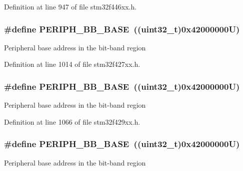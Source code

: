 Definition at line 947 of file stm32f446xx.\+h.

\subsubsection[{\texorpdfstring{P\+E\+R\+I\+P\+H\+\_\+\+B\+B\+\_\+\+B\+A\+SE}{PERIPH_BB_BASE}}]{\setlength{\rightskip}{0pt plus 5cm}\#define P\+E\+R\+I\+P\+H\+\_\+\+B\+B\+\_\+\+B\+A\+SE~((uint32\+\_\+t)0x42000000\+U)}\hypertarget{group___peripheral__memory__map_gaed7efc100877000845c236ccdc9e144a}{}\label{group___peripheral__memory__map_gaed7efc100877000845c236ccdc9e144a}
Peripheral base address in the bit-\/band region 

Definition at line 1014 of file stm32f427xx.\+h.

\subsubsection[{\texorpdfstring{P\+E\+R\+I\+P\+H\+\_\+\+B\+B\+\_\+\+B\+A\+SE}{PERIPH_BB_BASE}}]{\setlength{\rightskip}{0pt plus 5cm}\#define P\+E\+R\+I\+P\+H\+\_\+\+B\+B\+\_\+\+B\+A\+SE~((uint32\+\_\+t)0x42000000\+U)}\hypertarget{group___peripheral__memory__map_gaed7efc100877000845c236ccdc9e144a}{}\label{group___peripheral__memory__map_gaed7efc100877000845c236ccdc9e144a}
Peripheral base address in the bit-\/band region 

Definition at line 1066 of file stm32f429xx.\+h.

\subsubsection[{\texorpdfstring{P\+E\+R\+I\+P\+H\+\_\+\+B\+B\+\_\+\+B\+A\+SE}{PERIPH_BB_BASE}}]{\setlength{\rightskip}{0pt plus 5cm}\#define P\+E\+R\+I\+P\+H\+\_\+\+B\+B\+\_\+\+B\+A\+SE~((uint32\+\_\+t)0x42000000\+U)}\hypertarget{group___peripheral__memory__map_gaed7efc100877000845c236ccdc9e144a}{}\label{group___peripheral__memory__map_gaed7efc100877000845c236ccdc9e144a}
Peripheral base address in the bit-\/band region 

